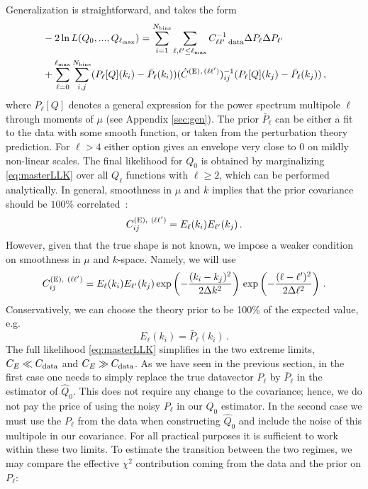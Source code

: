 \documentclass[12pt,a4paper]{article}
\newcommand{\be}{\begin{equation}}
\newcommand{\ee}{\end{equation}}
\renewcommand{\ln}{\mathop{\rm ln}\nolimits}
\begin{document}
Generalization is straightforward, and takes the form
\be 
\label{eq:masterLLK}
\begin{split}
& -2\ln L(Q_0,...,Q_{\ell_{\rm max}}) = \sum_{i=1}^{N_{\rm bins}} \sum_{\ell,\ell' \leq \ell_{\rm max}}C_{\ell \ell'~{\rm data}}^{-1}\Delta P_{\ell}\Delta P_{\ell'} \\
& + \sum_{\ell=0}^{\ell_{\rm max}}\sum_{i,j}^{N_{\rm bins}} 
(P_\ell[Q](k_i) -  \bar P_{\ell}(k_i)) (\hat{C}^{ ({\rm E}),\,(\ell \ell')})^{-1} _{ij} (P_\ell[Q](k_j) - \bar P_{\ell}(k_j)) \,,
\end{split}
\ee
where $P_\ell[Q]$ denotes a general expression for the 
power spectrum multipole $\ell$ through moments of $\mu$ (see Appendix \ref{sec:gen}).
The prior $\bar P_{\ell}$ can be either a fit to the data with some smooth function, or taken from the perturbation theory prediction. 
For $\ell > 4$ either option  gives an envelope very close to $0$ on mildly non-linear scales.
The final likelihood for $Q_0$ is obtained by marginalizing \eqref{eq:masterLLK}
over all $Q_{\ell}$ functions with $\ell \geq 2$, which can be performed analytically.
In general, smoothness in $\mu$ and $k$ implies that the prior covariance should be $100\%$ correlated~\cite{Chudaykin:2020aoj}:
\be
C^{({\rm E}),~(\ell \ell')}_{ij}= E_\ell(k_i) E_{\ell'}(k_j) \,.
\ee
However, given that the true shape is not known, 
we impose a weaker condition on smoothness in $\mu$ and $k$-space. Namely, we will use~\cite{Chudaykin:2020hbf}
\be
C^{({\rm E}),~(\ell \ell')}_{ij}= E_\ell(k_i) E_{\ell'}(k_j)\, \mathrm{exp}\left(-\frac{(k_i-k_j)^2}{2\Delta k^2}\right)\,\mathrm{exp}\left(-\frac{(\ell - \ell')^2}{2\Delta \ell^2}\right)\,.
\ee
Conservatively, we can choose the theory prior to be 100$\%$ of the expected value, e.g. 
\be
E_\ell(k_i) =  \bar P_\ell (k_i)\,.
\ee
The full likelihood \eqref{eq:masterLLK} simplifies in the two extreme limits, $C_{E} \ll C_{\rm data}$ and $C_{E} \gg C_{\rm data}$. As we have seen in the previous section, in the first case 
one needs to simply replace the true datavector $P_{\ell}$ by $\bar P_{\ell}$ in the estimator of $\hat Q_{0}$. This does not require any change to the covariance; hence, we do not pay the price of using the noisy $P_{\ell}$ in our $Q_0$ estimator.  
In the second case we must use the $P_{\ell}$ from the data when constructing $\hat Q_{0}$
and include the noise of this multipole in our covariance. 
For all practical purposes it is sufficient to work within these two limits. 
To estimate the transition between the two regimes, we may compare the effective 
$\chi^2$ contribution coming from the data and the prior on $P_\ell$:
\end{document}
